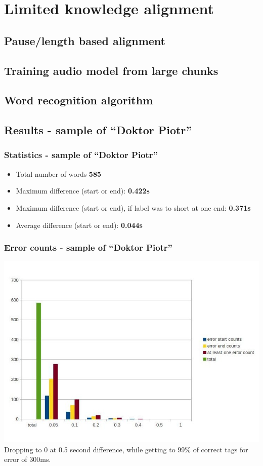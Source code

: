 \documentclass[]{beamer}
\begin{document}
\section{Limited knowledge alignment}
\subsection{Pause/length based alignment}
\begin{frame}
\end{frame}
\subsection{Training audio model from large chunks}
\begin{frame}
\end{frame}
\subsection{Word recognition algorithm}
\begin{frame}
\end{frame}
\subsection{Results - sample of “Doktor Piotr”}
\begin{frame}
    \frametitle{Statistics - sample of “Doktor Piotr”}
    \begin{itemize}
        \item Total number of words				\textbf{585}
        \item Maximum difference (start or end): 			\textbf{0.422s}
        \item Maximum difference (start or end), if label was to short at one end: 			\textbf{0.371s}
        \item Average difference  (start or end):			\textbf{0.044s}
    \end{itemize}
\end{frame}
\begin{frame}
    \frametitle{Error counts - sample of “Doktor Piotr”}
    \includegraphics[scale=0.37]{doktor_piotr_length_based_counts.jpg}
    Dropping to 0 at 0.5 second difference, while getting to 99\% of correct tags for error of 300ms.
\end{frame}
\end{document}
